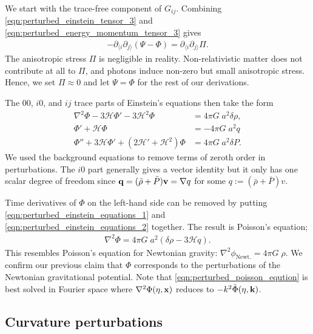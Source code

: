 We start with the trace-free component of $G_{ij}$. Combining  \eqref{eqn:perturbed_einstein_tensor_3} and \eqref{eqn:perturbed_energy_momentum_tensor_3} gives
\begin{align}
	-\partial_{\langle i} \partial_{j \rangle} (\Psi - \Phi) = \partial_{\langle i} \partial_{j \rangle} \Pi.
\end{align}
The anisotropic stress $\Pi$ is negligible in reality. Non-relativistic matter does not contribute at all to $\Pi$, and photons induce non-zero but small anisotropic stress. Hence, we set $\Pi\approx 0$ and let $\Psi = \Phi$ for the rest of our derivations.

The $00$, $i0$, and $ij$ trace parts of Einstein's equations then take the form
\begin{align}
	\nabla^2 \Phi - 3 \mathcal{H} \Phi' - 3\mathcal{H}^2 \Phi &= 4\pi G \; a^2 \delta\rho, \label{eqn:perturbed_einstein_equations_1}\\
	\Phi' + \mathcal{H} \Phi &= -4\pi G \; a^2 q \label{eqn:perturbed_einstein_equations_2}\\
	\Phi'' + 3\mathcal{H} \Phi' + (2\mathcal{H}' + \mathcal{H}^2) \Phi &= 4\pi G \; a^2 \delta P. \label{eqn:perturbed_einstein_equations_3}
\end{align}
We used the background equations to remove terms of zeroth order in perturbations. The $i0$ part generally gives a vector identity but it only has one scalar degree of freedom since $\mathbf{q}=(\bar{\rho}+\bar{P})\mathbf{v} = \nabla q$ for some $q := (\bar{\rho}+\bar{P}) v$.

Time derivatives of $\Phi$ on the left-hand side can be removed by putting \eqref{eqn:perturbed_einstein_equations_1} and \eqref{eqn:perturbed_einstein_equations_2} together. The result is Poisson's equation;
\begin{align}
	\nabla^2 \Phi = 4\pi G \; a^2 (\delta\rho - 3\mathcal{H}q). \label{eqn:perturbed_poisson_eqution}
\end{align}
This resembles Poisson's equation for Newtonian gravity: $\nabla^2 \phi_{\text{Newt.}} = 4\pi G \; \rho$. We confirm our previous claim that $\Phi$ corresponds to the perturbations of the Newtonian gravitational potential. Note that \eqref{eqn:perturbed_poisson_eqution} is best solved in Fourier space where $\nabla^2\Phi(\eta,\mathbf{x})$ reduces to $-k^2 \tilde{\Phi}(\eta,\mathbf{k})$.


\subsection{Curvature perturbations} \label{section:curvature_perturbations}

